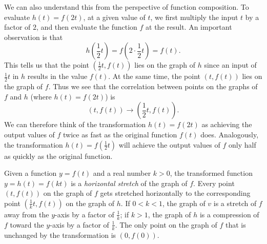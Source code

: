 \documentclass{ximera}
\begin{document}
We can also understand this from the perspective of function composition.  To evaluate \(h(t) = f(2t)\), at a given value of \(t\), we first multiply the input \(t\) by a factor of \(2\), and then evaluate the function \(f\) at the result.  An important observation is that%
\[
h\left( \frac{1}{2}t \right) = f\left( 2 \cdot \frac{1}{2}t \right) = f(t)\text{.}
\]
This tells us that the point \((\frac{1}{2}t, f(t))\) lies on the graph of \(h\) since an input of \(\frac{1}{2}t\) in \(h\) results in the value \(f(t)\).  At the same time, the point \((t,f(t))\) lies on the graph of \(f\).  Thus we see that the correlation between points on the graphs of \(f\) and \(h\) (where \(h(t) = f(2t)\)) is%
\[
(t, f(t)) \rightarrow \left( \frac{1}{2}t, f(t) \right)\text{.}
\]
We can therefore think of the transformation \(h(t) = f(2t)\) as achieving the output values of \(f\) twice as fast as the original function \(f(t)\) does.  Analogously, the transformation \(h(t) = f(\frac{1}{2}t)\) will achieve the output values of \(f\) only half as quickly as the original function.%

Given a function \(y = f(t)\) and a real number \(k \gt 0\), the transformed function \(y = h(t) = f(kt)\) is a \emph{horizontal stretch} of the graph of \(f\).  Every point \((t,f(t))\) on the graph of \(f\) gets stretched horizontally to the corresponding point \((\frac{1}{k}t,f(t))\) on the graph of \(h\).  If \(0 \lt k \lt 1\), the graph of \(v\) is a stretch of \(f\) away from the \(y\)-axis by a factor of \(\frac{1}{k}\); if \(k \gt 1\), the graph of \(h\) is a compression of \(f\) toward the \(y\)-axis by a factor of \(\frac{1}{k}\).  The only point on the graph of \(f\) that is unchanged by the transformation is \((0,f(0))\).%
\end{document}
